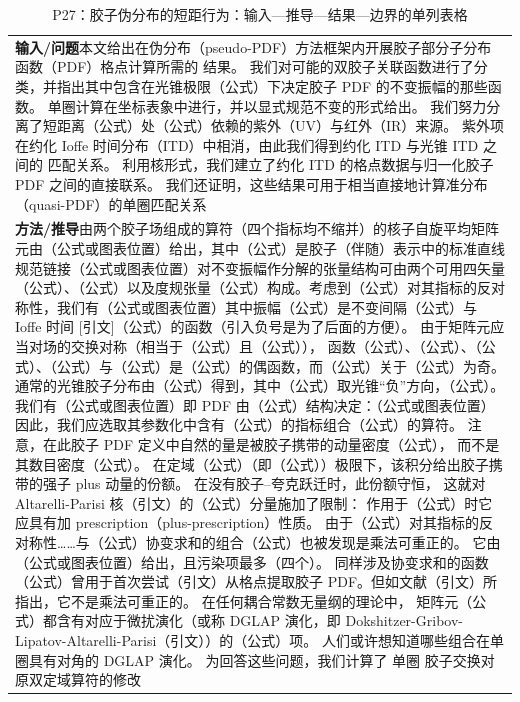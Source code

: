 \documentclass[UTF8,11pt,oneside]{ctexbook}
\begin{document}
\begin{table}[htbp]
  \centering
  \caption*{P27：胶子伪分布的短距行为：输入—推导—结果—边界的单列表格}
  \small
  \begin{tabular}{@{}p{}@{}}
    \toprule
    \textbf{输入/问题}\quad 本文给出在伪分布（pseudo-PDF）方法框架内开展胶子部分子分布函数（PDF）格点计算所需的 结果。 我们对可能的双胶子关联函数进行了分类，并指出其中包含在光锥极限（公式）下决定胶子 PDF 的不变振幅的那些函数。 单圈计算在坐标表象中进行，并以显式规范不变的形式给出。 我们努力分离了短距离（公式）处（公式）依赖的紫外（UV）与红外（IR）来源。 紫外项在约化 Ioffe 时间分布（ITD）中相消，由此我们得到约化 ITD 与光锥 ITD 之间的 匹配关系。 利用核形式，我们建立了约化 ITD 的格点数据与归一化胶子 PDF 之间的直接联系。 我们还证明，这些结果可用于相当直接地计算准分布（quasi-PDF）的单圈匹配关系 \\
    \textbf{方法/推导}\quad 由两个胶子场组成的算符（四个指标均不缩并）的核子自旋平均矩阵元由（公式或图表位置）给出，其中（公式）是胶子（伴随）表示中的标准直线规范链接（公式或图表位置）对不变振幅作分解的张量结构可由两个可用四矢量（公式）、（公式）以及度规张量（公式）构成。考虑到（公式）对其指标的反对称性，我们有（公式或图表位置）其中振幅（公式）是不变间隔（公式）与 Ioffe 时间 [引文]（公式）的函数（引入负号是为了后面的方便）。 由于矩阵元应当对场的交换对称（相当于（公式）且（公式））， 函数（公式）、（公式）、（公式）、（公式）与（公式）是（公式）的偶函数，而（公式）关于（公式）为奇。 通常的光锥胶子分布由（公式）得到，其中（公式）取光锥``负''方向，（公式）。我们有（公式或图表位置）即 PDF 由（公式）结构决定：（公式或图表位置）因此，我们应选取其参数化中含有（公式）的指标组合（公式）的算符。 注意，在此胶子 PDF 定义中自然的量是被胶子携带的动量密度（公式）， 而不是其数目密度（公式）。 在定域（公式）（即（公式））极限下，该积分给出胶子携带的强子 plus 动量的份额。 在没有胶子–夸克跃迁时，此份额守恒， 这就对 Altarelli-Parisi 核（引文）的（公式）分量施加了限制： 作用于（公式）时它应具有加 prescription（plus-prescription）性质。 由于（公式）对其指标的反对称性……与（公式）协变求和的组合（公式）也被发现是乘法可重正的。 它由（公式或图表位置）给出，且污染项最多（四个）。 同样涉及协变求和的函数（公式）曾用于首次尝试（引文）从格点提取胶子 PDF。但如文献（引文）所指出，它不是乘法可重正的。 在任何耦合常数无量纲的理论中， 矩阵元（公式）都含有对应于微扰演化（或称 DGLAP 演化，即 Dokshitzer-Gribov-Lipatov-Altarelli-Parisi（引文））的（公式）项。 人们或许想知道哪些组合在单圈具有对角的 DGLAP 演化。 为回答这些问题，我们计算了 单圈 胶子交换对原双定域算符的修改 \\

\end{tabular}
\end{table}
\end{document}
